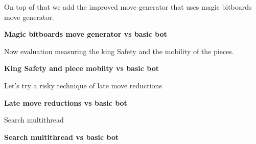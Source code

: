 On top of that we add the improved move generator that uses magic bitboards move generator.

\textbf{Magic bitboards move generator vs basic bot}\\
\medskip

Now evaluation measuring the king Safety and the mobility of the pieces.

\textbf{King Safety and piece mobilty vs basic bot}\\
\medskip

Let's try a risky technique of late move reductions

\textbf{Late move reductions vs basic bot}\\
\medskip

Search multithread

\textbf{Search multithread vs basic bot}\\
